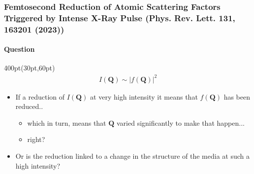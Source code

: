 \begin{frame}
\frametitle{Femtosecond Reduction of Atomic Scattering Factors Triggered by 
Intense X-Ray Pulse \small (Phys. Rev. Lett. \textbf{131}, 163201 (2023))}
\framesubtitle{Question}


\footnotesize
 
\begin{textblock*}{400pt}(30pt,60pt)
\begin{align}
I(\boldsymbol{Q})  \sim \left| f(\boldsymbol{Q})\right|^2 \nonumber
\end{align}
\begin{itemize}
\item If a reduction of $I(\boldsymbol{Q})$ at very high intensity
it means that $f(\boldsymbol{Q})$ has been reduced..
\begin{itemize}
\footnotesize
\item[$\bullet$] which in turn, means that $\boldsymbol{Q}$ 
varied significantly to make that happen...
\item[$\bullet$] right?
\end{itemize}
\item Or is the reduction linked to a change in the structure of the media
at such a high intensity?
\end{itemize}
\end{textblock*}



\end{frame}





